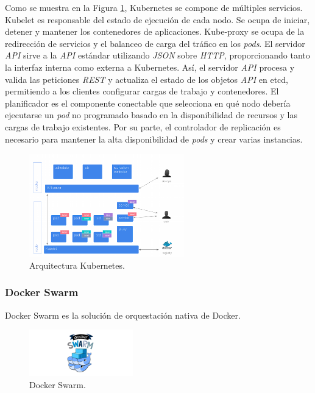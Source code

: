Como se muestra en la Figura \ref{fig:kubernetesarchitecture}, Kubernetes se compone de múltiples servicios. Kubelet es responsable del estado de ejecución de cada nodo. Se ocupa de iniciar, detener y mantener los contenedores de aplicaciones. Kube-proxy se ocupa de la redirección de servicios y el balanceo de carga del tráfico en los \textit{pods}. El servidor \textit{API} sirve a la \textit{API} estándar utilizando \textit{JSON} sobre \textit{HTTP}, proporcionando tanto la interfaz interna como externa a Kubernetes. Así, el servidor \textit{API} procesa y valida las peticiones \textit{REST} y actualiza el estado de los objetos \textit{API} en etcd, permitiendo a los clientes configurar cargas de trabajo y contenedores. El planificador es el componente conectable que selecciona en qué nodo debería ejecutarse un \textit{pod} no programado basado en la disponibilidad de recursos y las cargas de trabajo existentes. Por su parte, el controlador de replicación es necesario para mantener la alta disponibilidad de \textit{pods} y crear varias instancias. 

\begin{figure}[H]
\centering
\includegraphics[width=0.6\textwidth]{images/figures/kubernetesarchitecture.png}
\caption{Arquitectura Kubernetes.\footnotemark \label{fig:kubernetesarchitecture}}
\end{figure}


\subsubsection{Docker Swarm}

Docker Swarm es la solución de orquestación nativa de Docker.

\begin{figure}[H]
\centering
\includegraphics[width=0.4\textwidth]{images/figures/swarm.png}
\caption{Docker Swarm.\footnotemark}
\end{figure}


